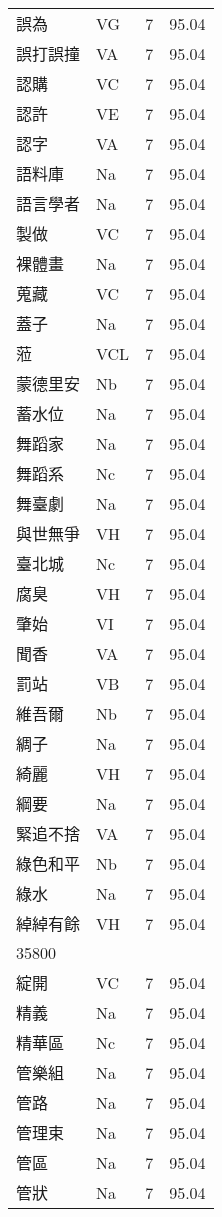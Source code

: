 \documentclass[twocolumn]{book}
\begin{document}
\begin{supertabular}{llrr}
誤為 & VG & 7 &  95.04\\
誤打誤撞 & VA & 7 &  95.04\\
認購 & VC & 7 &  95.04\\
認許 & VE & 7 &  95.04\\
認字 & VA & 7 &  95.04\\
語料庫 & Na & 7 &  95.04\\
語言學者 & Na & 7 &  95.04\\
製做 & VC & 7 &  95.04\\
裸體畫 & Na & 7 &  95.04\\
蒐藏 & VC & 7 &  95.04\\
蓋子 & Na & 7 &  95.04\\
蒞 & VCL & 7 &  95.04\\
蒙德里安 & Nb & 7 &  95.04\\
蓄水位 & Na & 7 &  95.04\\
舞蹈家 & Na & 7 &  95.04\\
舞蹈系 & Nc & 7 &  95.04\\
舞臺劇 & Na & 7 &  95.04\\
與世無爭 & VH & 7 &  95.04\\
臺北城 & Nc & 7 &  95.04\\
腐臭 & VH & 7 &  95.04\\
肇始 & VI & 7 &  95.04\\
聞香 & VA & 7 &  95.04\\
罰站 & VB & 7 &  95.04\\
維吾爾 & Nb & 7 &  95.04\\
綢子 & Na & 7 &  95.04\\
綺麗 & VH & 7 &  95.04\\
綱要 & Na & 7 &  95.04\\
緊追不捨 & VA & 7 &  95.04\\
綠色和平 & Nb & 7 &  95.04\\
綠水 & Na & 7 &  95.04\\
綽綽有餘 & VH & 7 &  95.04\\
35800\\
綻開 & VC & 7 &  95.04\\
精義 & Na & 7 &  95.04\\
精華區 & Nc & 7 &  95.04\\
管樂組 & Na & 7 &  95.04\\
管路 & Na & 7 &  95.04\\
管理束 & Na & 7 &  95.04\\
管區 & Na & 7 &  95.04\\
管狀 & Na & 7 &  95.04\\

\end{supertabular}
\end{document}
